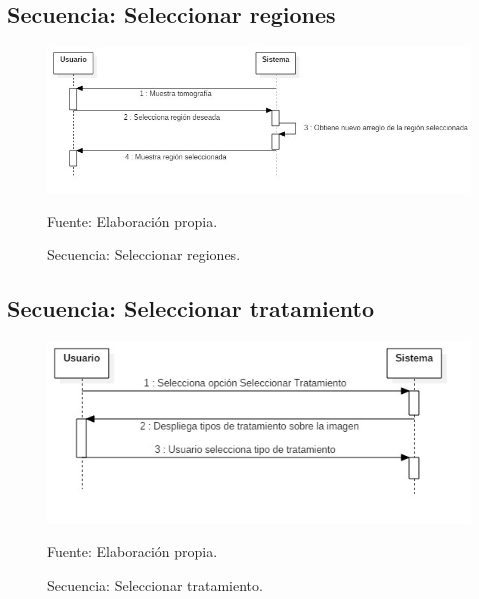 \documentclass[12pt]{report}
\begin{document}
\subsection{Secuencia: Seleccionar regiones}
\begin{figure}[H]
\centering
\includegraphics[width = 12 cm, height = 7 cm]{region}
\caption{Secuencia: Seleccionar regiones.}
Fuente: Elaboración propia.
\end{figure}

\subsection{Secuencia: Seleccionar tratamiento}
\begin{figure}[H]
\centering
\includegraphics[width = 12 cm, height = 7 cm]{tratamientodeimagen}
\caption{Secuencia: Seleccionar tratamiento.}
Fuente: Elaboración propia.
\end{figure}
\end{document}
